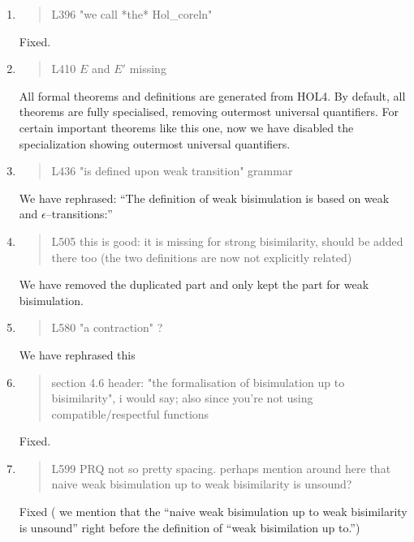 \begin{enumerate}
\item \begin{quote}
    L396 "we call *the* Hol_coreln"
  \end{quote}
  Fixed.
  
\item \begin{quote}
    L410 $E$ and $E'$ missing
  \end{quote}
  All formal theorems and definitions are generated from HOL4.
  By default, all theorems are fully specialised, removing outermost
  universal quantifiers. For certain important theorems like this one,
  now we have disabled the specialization showing outermost
  universal quantifiers.
  
\item \begin{quote}
    L436 "is defined upon weak transition" grammar
  \end{quote}

We have rephrased: ``The definition of weak bisimulation is based on weak
  and $\epsilon$--transitions:''
  
\item \begin{quote}
    L505 this is good: it is missing for strong bisimilarity, should
    be added there too (the two definitions are now not explicitly
    related)
  \end{quote}
  We have removed the duplicated part and only kept the part for weak bisimulation.

\item \begin{quote}
    L580 "a contraction" ?
  \end{quote}
We have rephrased this
  
\item \begin{quote}
    section 4.6 header: "the formalisation of bisimulation up to
    bisimilarity", i would say; also since you're not using
    compatible/respectful functions
  \end{quote}
  Fixed.
  
\item \begin{quote}
    L599 PRQ not so pretty spacing. perhaps mention around here that
    naive weak bisimulation up to weak bisimilarity is unsound?
  \end{quote}
  Fixed ( we  mention that the ``naive weak bisimulation up to weak
  bisimilarity is unsound'' right before the definition of ``weak
  bisimilation up to.'')
  

\end{enumerate}
